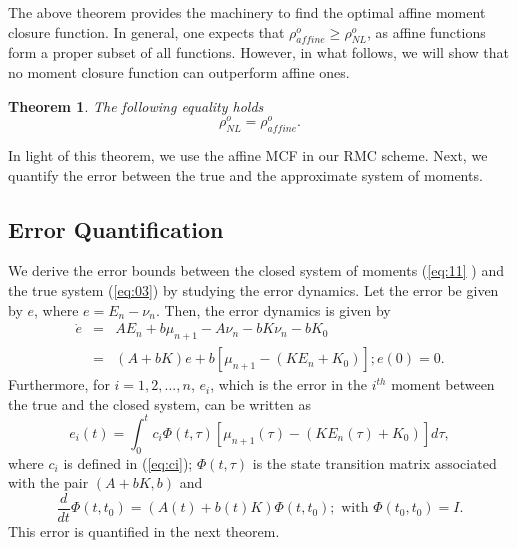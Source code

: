 \documentclass[letterpaper, 10 pt, conference]{ieeeconf}
\newtheorem{theorem}{Theorem}
\begin{document}
The above theorem provides the machinery to find the optimal affine moment
closure function. In general, one expects that $\rho _{affine}^{o}\geq \rho
_{NL}^{o}$, as affine functions form a proper subset of all functions.
However, in what follows, we will show that no moment closure function can
outperform affine ones.

\begin{theorem}
\label{theorem:NL vs Affine}The following equality holds%
\begin{equation}
\rho _{NL}^{o}=\rho _{affine}^{o}.  \label{eq:06}
\end{equation}
\end{theorem}

In light of this theorem, we use the affine MCF in our RMC scheme. Next, we
quantify the error between the true and the approximate system of moments.



\subsection{Error Quantification}

We derive the error bounds between the closed system of moments (\ref{eq:11}%
) and the true system (\ref{eq:03}) by studying the error dynamics. Let the
error be given by $e$, where $e=E_{n}-\nu _{n}$. Then, the error dynamics is
given by%
\begin{eqnarray*}
\dot{e} &=&AE_{n}+b\mu _{n+1}-A\nu _{n}-bK\nu _{n}-bK_{0} \\
&=&\left( A+bK\right) e+b\left[ \mu _{n+1}-\left( KE_{n}+K_{0}\right) \right]
;e\left( 0\right) =0.
\end{eqnarray*}%
Furthermore, for $i=1,2,...,n$, $e_{i}$, which is the error in the $i^{th}$
moment between the true and the closed system, can be written as%
\begin{equation}
e_{i}\left( t\right) =\int_{0}^{t}c_{i}\Phi \left( t,\tau \right) \left[ \mu
_{n+1}\left( \tau \right) -\left( KE_{n}\left( \tau \right) +K_{0}\right) %
\right] d\tau ,  \label{eq:09}
\end{equation}%
where $c_{i}$ is defined in (\ref{eq:ci}); $\Phi \left( t,\tau \right) $ is
the state transition matrix associated with the pair $\left( A+bK,b\right) $
and%
\begin{equation*}
\frac{d}{dt}\Phi \left( t,t_{0}\right) =\left( A\left( t\right) +b\left(
t\right) K\right) \Phi \left( t,t_{0}\right) ;\text{ with }\Phi \left(
t_{0},t_{0}\right) =I.
\end{equation*}%
This error is quantified in the next theorem.
\end{document}
